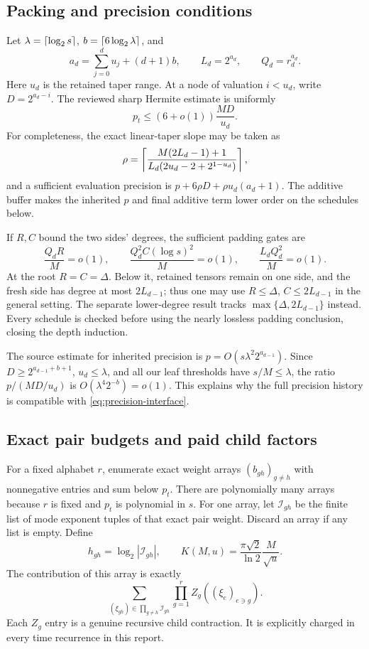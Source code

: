 \subsection{Packing and precision conditions}

Let $\lambda=\left\lceil\log_2s\right\rceil$, $b=\left\lceil6\log_2\lambda\right\rceil$, and
\[
 a_d=\sum_{j=0}^d u_j+(d+1)b,\qquad
 L_d=2^{a_d},\qquad Q_d=r_d^{a_d}.
\]
Here $u_d$ is the retained taper range. At a node of valuation $i<u_d$,
write $D=2^{a_d-i}$. The reviewed sharp Hermite estimate is uniformly
\begin{equation}
 p_t\le(6+o(1))\frac{MD}{u_d}.
 \label{eq:precision-interface}
\end{equation}
For completeness, the exact linear-taper slope may be taken as
\[
 \rho=\left\lceil\frac{M(2L_d-1)+1}
 {L_d(2u_d-2+2^{1-u_d})}\right\rceil,
\]
and a sufficient evaluation precision is
$p+6\rho D+\rho u_d(a_d+1)$.
The additive buffer makes the inherited $p$ and final additive term
lower order on the schedules below.

If $R,C$ bound the two sides' degrees, the sufficient padding gates are
\begin{equation}
 \frac{Q_dR}{M}=o(1),\qquad
 \frac{Q_d^2C(\log s)^2}{M}=o(1),\qquad
 \frac{L_dQ_d^2}{M}=o(1).
 \label{eq:padding-interface}
\end{equation}
At the root $R=C=\Delta$. Below it, retained tensors remain on one side,
and the fresh side has degree at most $2L_{d-1}$; thus one may use
$R\le\Delta$, $C\le2L_{d-1}$ in the general setting.
The separate lower-degree result tracks
$\max\{\Delta,2L_{d-1}\}$ instead. Every schedule is checked before using
the nearly lossless padding conclusion, closing the depth induction.

The source estimate for inherited precision is
$p=O(s\lambda^2 2^{a_{d-1}})$.
Since $D\ge2^{a_{d-1}+b+1}$, $u_d\le\lambda$, and all our leaf
thresholds have $s/M\le\lambda$, the ratio
$p/(MD/u_d)$ is $O(\lambda^4 2^{-b})=o(1)$.
This explains why the full precision history is compatible with
\eqref{eq:precision-interface}.

\subsection{Exact pair budgets and paid child factors}

For a fixed alphabet $r$, enumerate exact weight arrays
$(b_{gh})_{g\ne h}$ with nonnegative entries and sum below $p_t$.
There are polynomially many arrays because $r$ is fixed and $p_t$ is
polynomial in $s$. For one array, let $\mathcal I_{gh}$ be the finite
list of mode exponent tuples of that exact pair weight. Discard an
array if any list is empty. Define
\[
 h_{gh}=\log_2|\mathcal I_{gh}|,\qquad
 K(M,u)=\frac{\pi\sqrt2}{\ln2}\frac M{\sqrt u}.
\]
The contribution of this array is exactly
\begin{equation}
 \sum_{(\xi_{gh})\in\prod_{g\ne h}\mathcal I_{gh}}
       \prod_{g=1}^r Z_g((\xi_e)_{e\ni g}).
 \label{eq:pair-identity}
\end{equation}
Each $Z_g$ entry is a genuine recursive child contraction. It is
explicitly charged in every time recurrence in this report.

